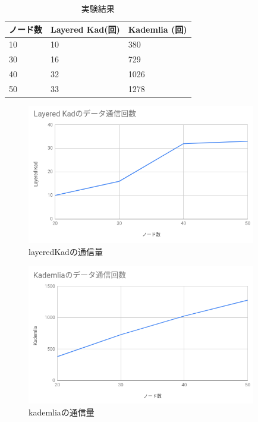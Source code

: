 \documentclass[sotsuron]{jcsie}
\begin{document}
\begin{table}[H]
	\caption{実験結果}
	\centering
	\label{table:traffic-result}
	\begin{tabular}{|l|l|l|}
		\hline
		ノード数     &
		Layered Kad(回) &
		Kademlia (回)\\ 
		\hline
		10               &
		10               &
		380\\
		\hline
		30               &
		16               &
		729\\
		\hline
		40               &
		32               &
		1026\\
		\hline
		50               &
		33               &
		1278\\
		\hline
	\end{tabular}
\end{table}

\begin{figure}[H]
	\centering
	\includegraphics[width=10cm]{./assets/image/layered-kad_traffic.png}
	\caption{layeredKadの通信量}
	\label{figure:traffic-1}
\end{figure}

\begin{figure}[H]
	\centering
	\includegraphics[width=10cm]{./assets/image/kad_traffic.png}
	\caption{kademliaの通信量}
	\label{figure:traffic-2}
\end{figure}
\end{document}
